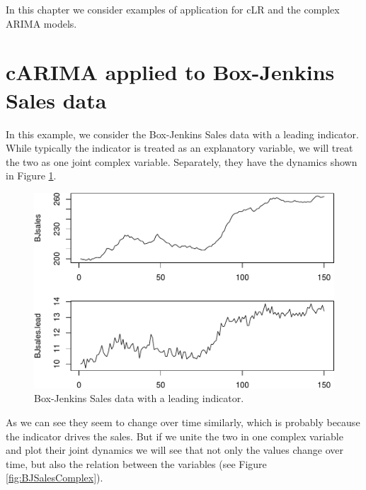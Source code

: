 \documentclass[
]{book}
\begin{document}
In this chapter we consider examples of application for cLR and the complex ARIMA models.

\hypertarget{carima-applied-to-box-jenkins-sales-data}{%
\section{cARIMA applied to Box-Jenkins Sales data}\label{carima-applied-to-box-jenkins-sales-data}}

In this example, we consider the Box-Jenkins Sales data with a leading indicator. While typically the indicator is treated as an explanatory variable, we will treat the two as one joint complex variable. Separately, they have the dynamics shown in Figure \ref{fig:BJSales}.

\begin{figure}
\centering
\includegraphics{Svetunkov---Svetunkov---Complex-Valued-Econometrics_files/figure-latex/BJSales-1.pdf}
\caption{\label{fig:BJSales}Box-Jenkins Sales data with a leading indicator.}
\end{figure}

As we can see they seem to change over time similarly, which is probably because the indicator drives the sales. But if we unite the two in one complex variable and plot their joint dynamics we will see that not only the values change over time, but also the relation between the variables (see Figure \ref{fig:BJSalesComplex}).
\end{document}
